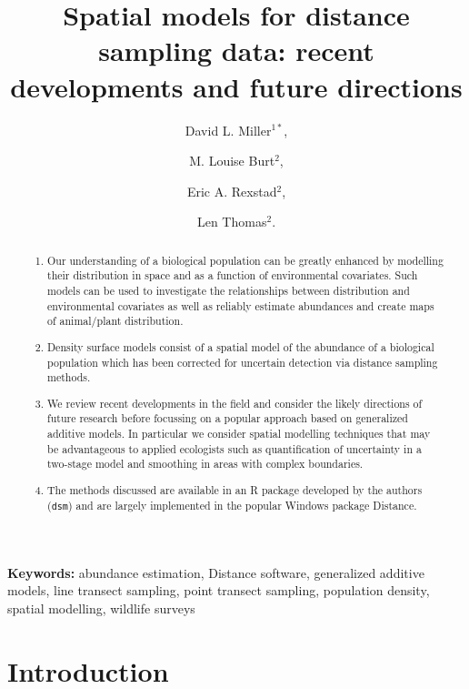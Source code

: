\documentclass[a4paper,12pt]{article}
\title{Spatial models for distance sampling data: recent developments and future directions}
\author{
David L. Miller$^{1*}$, \and
M. Louise Burt$^{2}$, \and
Eric A. Rexstad$^{2}$, \and 
Len Thomas$^{2}$.}
\begin{document}
\maketitle

\begin{abstract}
  \noindent 

\begin{enumerate}
	\item Our understanding of a biological population can be greatly enhanced by modelling their distribution in space and as a function of environmental covariates. Such models can be used to investigate the relationships between distribution and environmental covariates as well as reliably estimate abundances and create maps of animal/plant distribution. 
	\item Density surface models consist of a spatial model of the abundance of a biological population which has been corrected for uncertain detection via distance sampling methods. 
	\item We review recent developments in the field and consider the likely directions of future research before focussing on a popular approach based on generalized additive models.  In particular we consider spatial modelling techniques that may be advantageous to applied ecologists such as quantification of uncertainty in a two-stage model and smoothing in areas with complex boundaries.
	\item The methods discussed are available in an \textsf{R} package developed by the authors (\texttt{dsm}) and are largely implemented in the popular Windows package Distance.
\end{enumerate}
 

\end{abstract}

\noindent \textbf{Keywords:} abundance estimation, Distance software, generalized additive models, line transect sampling, point transect sampling, population density, spatial modelling, wildlife surveys


\newpage

\section*{Introduction}
\label{s:intro}
\end{document}

